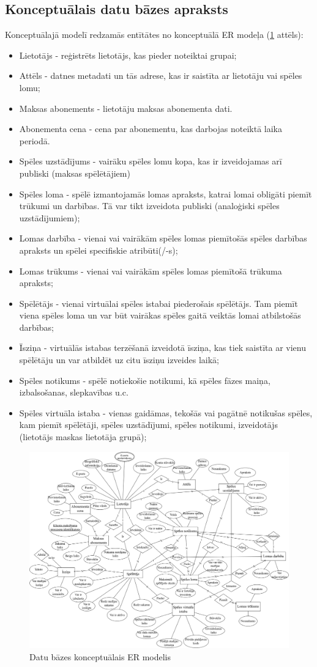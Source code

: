 \subsection{Konceptuālais datu bāzes apraksts}
Konceptuālajā modelī redzamās entītātes no konceptuālā ER modeļa (\ref{fig:conceptual-model} attēls):
\begin{itemize}
	\item Lietotājs - reģistrēts lietotājs, kas pieder noteiktai grupai;
	\item Attēls - datnes metadati un tās adrese, kas ir saistīta ar lietotāju vai spēles lomu;
	\item Maksas abonements - lietotāju maksas abonementa dati.
	\item Abonementa cena - cena par abonementu, kas darbojas noteiktā laika periodā.
	\item Spēles uzstādījums - vairāku spēles lomu kopa, kas ir izveidojamas arī publiski (maksas spēlētājiem)
	\item Spēles loma - spēlē izmantojamās lomas apraksts, katrai lomai obligāti piemīt trūkumi un darbības.
	      Tā var tikt izveidota publiski (analoģiski spēles uzstādījumiem);
	\item Lomas darbība - vienai vai vairākām spēles lomas piemītošās spēles darbības apraksts un spēlei specifiskie atribūti(/-s);
	\item Lomas trūkums - vienai vai vairākām spēles lomas piemītošā trūkuma apraksts;
	\item Spēlētājs - vienai virtuālai spēles istabai piederošais spēlētājs.
	      Tam piemīt viena spēles loma un var būt vairākas spēles gaitā veiktās
	      lomai atbilstošās darbības;
	\item Īsziņa - virtuālās istabas terzēšanā izveidotā īsziņa, kas tiek saistīta ar vienu spēlētāju un var atbildēt uz citu īsziņu izveides laikā;
	\item Spēles notikums - spēlē notiekošie notikumi, kā spēles fāzes maiņa, izbalsošanas, slepkavības u.c.
	\item Spēles virtuāla istaba - vienas gaidāmas, tekošās vai pagātnē notikušas spēles, kam piemīt spēlētāji, spēles uzstādījumi, spēles notikumi, izveidotājs (lietotājs maskas lietotāja grupā);
\end{itemize}

\begin{figure}[htbp]
	\centering
	\includegraphics[width=\linewidth]{./src/img/KonceptualaisERModelis.png}
	\caption{Datu bāzes konceptuālais ER modelis}
	\label{fig:conceptual-model}
\end{figure}
